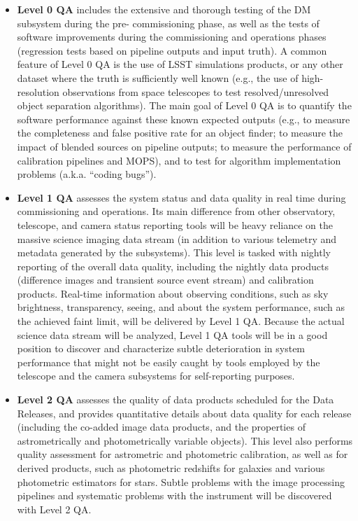 \documentclass[12pt]{article}
\begin{document}
\begin{itemize}
    \item {\bf Level 0 QA} includes the extensive and thorough testing of the DM subsystem during the pre- commissioning phase, as well as the tests of software improvements during the commissioning and operations phases (regression tests based on pipeline outputs and input truth). A common feature of Level 0 QA is the use of LSST simulations products, or any other dataset where the truth is sufficiently well known (e.g., the use of high-resolution observations from space telescopes to test resolved/unresolved object separation algorithms). The main goal of Level 0 QA is to quantify the software performance against these known expected outputs (e.g., to measure the completeness and false positive rate for an object finder; to measure the impact of blended sources on pipeline outputs; to measure the performance of calibration pipelines and MOPS), and to test for algorithm implementation problems (a.k.a. “coding bugs”).
    
    \item {\bf Level 1 QA} assesses the system status and data quality in real time during commissioning and operations. Its main difference from other observatory, telescope, and camera status reporting tools will be heavy reliance on the massive science imaging data stream (in addition to various telemetry and metadata generated by the subsystems). This level is tasked with nightly reporting of the overall data quality, including the nightly data products (difference images and transient source event stream) and calibration products. Real-time information about observing conditions, such as sky brightness, transparency, seeing, and about the system performance, such as the achieved faint limit, will be delivered by Level 1 QA. Because the actual science data stream will be analyzed, Level 1 QA tools will be in a good position to discover and characterize subtle deterioration in system performance that might not be easily caught by tools employed by the telescope and the camera subsystems for self-reporting purposes.

    \item {\bf Level 2 QA} assesses the quality of data products scheduled for the Data Releases, and provides quantitative details about data quality for each release (including the co-added image data products, and the properties of astrometrically and photometrically variable objects). This level also performs quality assessment for astrometric and photometric calibration, as well as for derived products, such as photometric redshifts for galaxies
      and various photometric estimators for stars. Subtle problems with the image processing pipelines and systematic problems with the instrument will be discovered with Level 2 QA.
    

\end{itemize}
\end{document}
